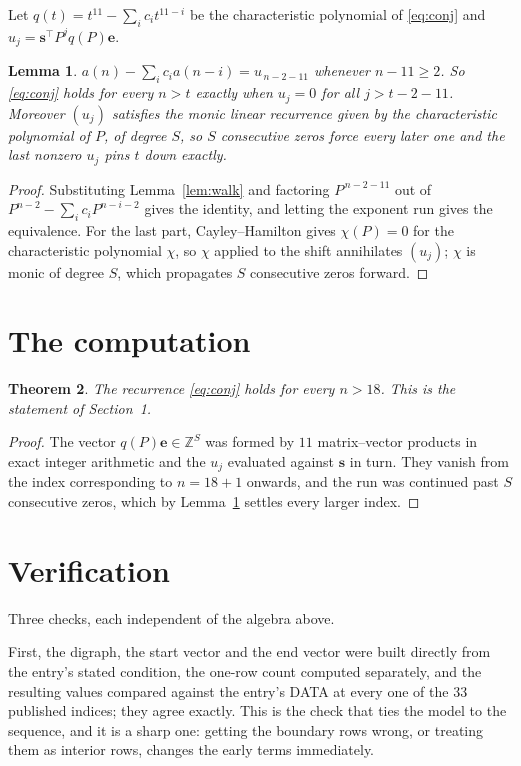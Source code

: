 \documentclass[11pt,a4paper]{article}
\theoremstyle{plain}
\newtheorem{theorem}{Theorem}
\newtheorem{lemma}[theorem]{Lemma}
\theoremstyle{definition}
\begin{document}
Let $q(t)=t^{11}-\sum_i c_i t^{11-i}$ be the characteristic polynomial of
\eqref{eq:conj} and $u_j=\mathbf{s}^{\!\top}P^{j}q(P)\mathbf{e}$.

\begin{lemma}\label{lem:crit}
$a(n)-\sum_i c_i a(n-i)=u_{\,n-2-11}$ whenever $n-11\ge2$. So \eqref{eq:conj}
holds for every $n>t$ exactly when $u_j=0$ for all $j>t-2-11$. Moreover $(u_j)$
satisfies the monic linear recurrence given by the characteristic polynomial of $P$, of
degree $S$, so $S$ consecutive zeros force every later one and the last nonzero $u_j$ pins
$t$ down exactly.
\end{lemma}

\begin{proof}
Substituting Lemma~\ref{lem:walk} and factoring $P^{\,n-2-11}$ out of
$P^{n-2}-\sum_i c_i P^{n-i-2}$ gives the identity, and letting the exponent run gives the
equivalence. For the last part, Cayley--Hamilton gives $\chi(P)=0$ for the characteristic
polynomial $\chi$, so $\chi$ applied to the shift annihilates $(u_j)$; $\chi$ is monic of
degree $S$, which propagates $S$ consecutive zeros forward.
\end{proof}

\section{The computation}

\begin{theorem}
The recurrence \eqref{eq:conj} holds for every $n>18$. This is the statement of
Section~1.
\end{theorem}

\begin{proof}
The vector $q(P)\mathbf{e}\in\mathbb{Z}^{S}$ was formed by $11$ matrix--vector
products in exact integer arithmetic and the $u_j$ evaluated against $\mathbf{s}$ in turn.
They vanish from the index corresponding to $n=18+1$ onwards, and the run was continued
past $S$ consecutive zeros, which by Lemma~\ref{lem:crit} settles every larger index.
\end{proof}

\section{Verification}

Three checks, each independent of the algebra above.

First, the digraph, the start vector and the end vector were built directly from the
entry's stated condition, the one-row count computed separately, and the resulting values
compared against the entry's DATA at every one of the $33$ published indices; they
agree exactly. This is the check that ties the model to the sequence, and it is a sharp one:
getting the boundary rows wrong, or treating them as interior rows, changes the early terms
immediately.
\end{document}

